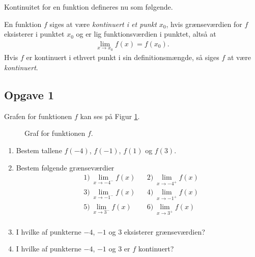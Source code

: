 Kontinuitet for en funktion defineres nu som følgende. 
\begin{defn}[Kontinuitet]
	En funktion $f$ siges at være \textit{kontinuert i et punkt $x_0$}, hvis grænseværdien for $f$ eksisterer i 
	punktet $x_0$ og er lig funktionsværdien i punktet, altså at
	\begin{align*}
		\lim_{x \to x_0} f(x) = f(x_0).
	\end{align*}	 
	Hvis $f$ er kontinuert i ethvert punkt i sin definitionsmængde, så siges $f$ at være \textit{kontinuert}.
\end{defn}



\newpage

\subsection*{Opgave 1}
Grafen for funktionen $f$ kan ses på Figur \ref{fig:kont1}.

\begin{figure}[H]
	\centering
	\caption{Graf for funktionen $f$.}
	\label{fig:kont1}
\end{figure}
\begin{enumerate}[label=\roman*)]
	\item Bestem tallene $f(-4)$, $f(-1)$, $f(1)$ og $f(3)$. 
	\item Bestem følgende grænseværdier
	\begin{align*}
		&1) \ \lim_{x \to -4^-}f(x) &   &2) \ \lim_{x \to -4^+}f(x) \\
		&3) \ \lim_{x \to -1^-}f(x) &   &4) \ \lim_{x \to -1^+}f(x) \\
		&5) \ \lim_{x \to 3^-}f(x) &   &6) \ \lim_{x \to 3^+}f(x) \\
	\end{align*}
	\item I hvilke af punkterne $-4$, $-1$ og $3$ eksisterer grænseværdien?
	\item I hvilke af punkterne $-4$, $-1$ og $3$ er $f$ kontinuert?
\end{enumerate}

